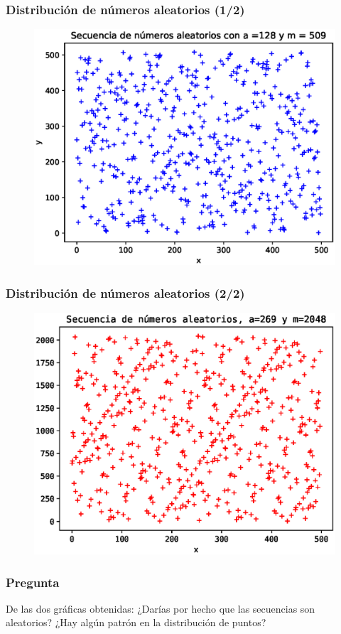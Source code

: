 \begin{frame}[fragile]
\frametitle{Distribución de números aleatorios (1/2)}
\begin{figure}
 \centering
 \includegraphics[scale=0.6]{Imagenes/Secuencia_aleatoria_01.eps}
\end{figure}
\end{frame}
\begin{frame}[fragile]
\frametitle{Distribución de números aleatorios (2/2)}
\begin{figure}
 \centering
 \includegraphics[scale=0.6]{Imagenes/Secuencia_aleatoria_02.eps}
\end{figure}
\end{frame}
\begin{frame}
\frametitle{Pregunta}
De las dos gráficas obtenidas: ¿Darías por hecho que las secuencias son aleatorios? ¿Hay algún patrón en la distribución de puntos?
\end{frame}
